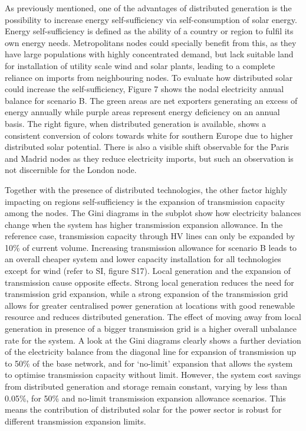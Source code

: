 \documentclass[review]{elsarticle}
\begin{document}
	As previously mentioned, one of the advantages of distributed generation is the possibility to increase energy self-sufficiency via self-consumption of solar energy. Energy self-sufficiency is defined as the ability of a country or region to fulfil its own energy needs. Metropolitans nodes could specially benefit from this, as they have large populations with highly concentrated demand, but lack suitable land for installation of utility scale wind and solar plants, leading to a complete reliance on imports from neighbouring nodes. To evaluate how distributed solar could increase the self-sufficiency, Figure 7 shows the nodal electricity annual balance for scenario B. The green areas are net exporters generating an excess of energy annually while purple areas represent energy deficiency on an annual basis. The right figure, when distributed generation is available, shows a consistent conversion of colors towards white for southern Europe due to higher distributed solar potential. There is also a visible shift observable for the Paris and Madrid nodes as they reduce electricity imports, but such an observation is not discernible for the London node.
	
	Together with the presence of distributed technologies, the other factor highly impacting on regions self-sufficiency is the expansion of transmission capacity among the nodes. The Gini diagrams in the subplot show how electricity balances change when the system has higher transmission expansion allowance. In the reference case, transmission capacity through HV lines can only be expanded by 10\% of current volume. Increasing transmission allowance for scenario B leads to an overall cheaper system and lower capacity installation for all technologies except for wind (refer to SI, figure S17). Local generation and the expansion of transmission cause opposite effects. Strong local generation reduces the need for transmission grid expansion, while a strong expansion of the transmission grid allows for greater centralised power generation at locations with good renewable resource and reduces distributed generation. The effect of moving away from local generation in presence of a bigger transmission grid is a higher overall unbalance rate for the system. A look at the Gini diagrams clearly shows a further deviation of the electricity balance from the diagonal line for expansion of transmission up to 50\% of the base network, and for ‘no-limit’ expansion that allows the system to optimise transmission capacity without limit. However, the system cost savings from distributed generation and storage remain constant, varying by less than 0.05\%, for 50\% and no-limit transmission expansion allowance scenarios. This means the contribution of distributed solar for the power sector is robust for different transmission expansion limits. 
	
\end{document}
